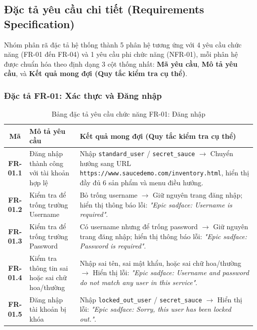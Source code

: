 \documentclass[a4paper]{article}
\begin{document}
\subsection{Đặc tả yêu cầu chi tiết (Requirements Specification)}
Nhóm phân rã đặc tả hệ thống thành 5 phân hệ tương ứng với 4 yêu cầu chức năng (FR-01 đến FR-04) và 1 yêu cầu phi chức năng (NFR-01), mỗi phân hệ được chuẩn hóa theo định dạng 3 cột thống nhất: \textbf{Mã yêu cầu}, \textbf{Mô tả yêu cầu}, và \textbf{Kết quả mong đợi (Quy tắc kiểm tra cụ thể)}.

\subsubsection{Đặc tả FR-01: Xác thực và Đăng nhập}
\begin{table}[H]
\centering
\small
\begin{tabularx}{\textwidth}{|c|p{4.5cm}|X|}
\hline
\textbf{Mã} & \textbf{Mô tả yêu cầu} & \textbf{Kết quả mong đợi (Quy tắc kiểm tra cụ thể)} \\ \hline
\textbf{FR-01.1} & Đăng nhập thành công với tài khoản hợp lệ & Nhập \texttt{standard\_user} / \texttt{secret\_sauce} $\rightarrow$ Chuyển hướng sang URL \texttt{https://www.saucedemo.com/inventory.html}, hiển thị đầy đủ 6 sản phẩm và menu điều hướng. \\ \hline
\textbf{FR-01.2} & Kiểm tra để trống trường Username & Bỏ trống username $\rightarrow$ Giữ nguyên trang đăng nhập; hiển thị thông báo lỗi: \textit{"Epic sadface: Username is required"}. \\ \hline
\textbf{FR-01.3} & Kiểm tra để trống trường Password & Có username nhưng để trống password $\rightarrow$ Giữ nguyên trang đăng nhập; hiển thị thông báo lỗi: \textit{"Epic sadface: Password is required"}. \\ \hline
\textbf{FR-01.4} & Kiểm tra thông tin sai hoặc sai chữ hoa/thường & Nhập sai tên, sai mật khẩu, hoặc sai chữ hoa/thường $\rightarrow$ Hiển thị lỗi: \textit{"Epic sadface: Username and password do not match any user in this service"}. \\ \hline
\textbf{FR-01.5} & Đăng nhập tài khoản bị khóa & Nhập \texttt{locked\_out\_user} / \texttt{secret\_sauce} $\rightarrow$ Hiển thị lỗi: \textit{"Epic sadface: Sorry, this user has been locked out."}. \\ \hline
\end{tabularx}
\caption{Bảng đặc tả yêu cầu chức năng FR-01: Đăng nhập}
\end{table}
\end{document}
